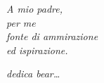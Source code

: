 \thispagestyle{empty}

\begin{flushright}
\Large\textit{
A mio padre,\\
per me\\
fonte di ammirazione\\
ed ispirazione.
}
\end{flushright}

\null\vfil

\begin{flushleft}
\Large\textit{dedica bear\dots}
\end{flushleft}

\cleardoublepage